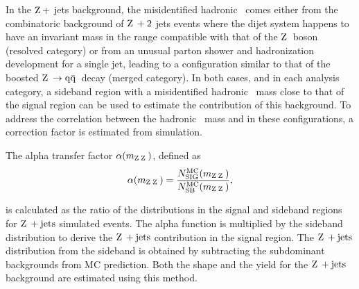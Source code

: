 
 In the $\mathrm{Z}\hspace{0.2em} +$ jets background, the misidentified hadronic \cPZ\ comes either from
 the combinatoric background of $\mathrm{Z}\hspace{0.2em} + 2$ jets events where the dijet system happens to have an invariant mass
 in the range compatible with that of the $\mathrm{Z}\hspace{0.2em}$ boson (resolved category)
 or from an unusual parton shower and hadronization development for a single jet, leading to a configuration similar to that of the boosted $\mathrm{Z}\hspace{0.2em}\to\mathrm{q\bar{q}}\hspace{0.2em}$  decay (merged category). In both cases, and in each analysis category, a sideband region with a misidentified hadronic \cPZ\ mass close to that
 of the signal region can be used to estimate the contribution of this background. To address the correlation
 between the hadronic \cPZ\ mass and \mZZ{} in these configurations, a correction factor is estimated from simulation.

 \par The alpha transfer factor $\alpha(m_{\mathrm{Z}\hspace{0.2em}\mathrm{Z}\hspace{0.2em}}{})$, defined as
 \begin{equation}
     \alpha(m_{\mathrm{Z}\hspace{0.2em}\mathrm{Z}\hspace{0.2em}}{}) = \frac{N_\textrm{SIG}^\textrm{MC}(m_{\mathrm{Z}\hspace{0.2em}\mathrm{Z}\hspace{0.2em}}{})}
     {N_\textrm{SB}^\textrm{MC}(m_{\mathrm{Z}\hspace{0.2em}\mathrm{Z}\hspace{0.2em}}{})},
 \end{equation}

 is calculated as the ratio of the \mZZ{} distributions in the signal and sideband regions for $\mathrm{Z}\hspace{0.2em} + \text{jets}$ simulated events.
 The alpha function is multiplied by the sideband \mZZ{} distribution to derive the $\mathrm{Z}\hspace{0.2em} + \text{jets}$ contribution in the signal region.
 The $\mathrm{Z}\hspace{0.2em} + \text{jets}$ distribution from the sideband is obtained by subtracting the subdominant backgrounds from MC prediction. Both the shape and the yield for the $\mathrm{Z}\hspace{0.2em} + \text{jets}$ background are estimated using this method.


